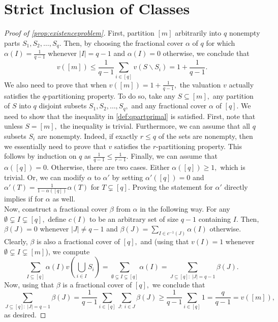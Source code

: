 \documentclass[11pt]{article}\usepackage{amsfonts}
\numberwithin{theorem}{subsection}
\begin{document}
\printbibliography
\appendix

\section{Strict Inclusion of Classes}
\label{appendix:existenceproblem}
\begin{proof}[Proof of \cref{prop:existenceproblem}]
First, partition $[m]$ arbitrarily into $q$ nonempty parts  $S_1, S_2, \ldots, S_q.$ Then, by choosing the fractional cover $\alpha$ of $q$ for which $\alpha (I) = \frac{1}{q-1}$ whenever $|I| = q-1$ and $\alpha (I) = 0$ otherwise, we conclude that 
$$
v([m])\le \frac{1}{q-1}\sum_{i\in [q]}v(S\backslash S_i) = 1+ \frac{1}{q-1}.$$
We also need to prove that when $v([m]) = 1+ \frac{1}{q-1},$ the valuation $v$ actually satisfies the $q$-partitioning property. To do so, take any $S\subseteq [m],$ any partition of  $S$ into $q$ disjoint subsets $S_1, S_2, \ldots, S_q,$ and any fractional cover $\alpha$ of $[q].$ We need to show that the inequality in \cref{def:qpartprimal} is satisfied. First, note that unless $S = [m],$ the inequality is trivial. Furthermore, we can assume that all $q$ subsets $S_i$ are nonempty. Indeed, if exactly $r\le q$ of the sets are nonempty, then we essentially need to prove that $v$ satisfies the $r$-partitioning property. This follows by induction on $q$ as $\frac{1}{q-1}\le \frac{1}{r-1}.$ Finally, we can assume that $\alpha([q]) = 0.$ Otherwise, there are two cases. Either $\alpha([q]) \ge 1,$ which is trivial. Or,  we can modify $\alpha$ to $\alpha'$ by setting $\alpha'([q]) = 0$ and $\alpha'(T) = \frac{1}{1-\alpha([q])}\alpha(T)$ for $T\subsetneq [q].$ Proving the statement for $\alpha'$ directly implies if for $\alpha$ as well.
\\
Now, construct a fractional cover $\beta$ from $\alpha$ in the following way. For any $\emptyset\subsetneq I\subsetneq[q],$ define $c(I)$ to be an arbitrary set of size $q-1$ containing $I.$ Then, $\beta(J) = 0$ whenever $|J|\neq q-1$ and $\beta(J)  =\sum_{I \in c^{-1}(J)}\alpha(I)$ otherwise. Clearly, $\beta$ is also a fractional cover of $[q],$ and (using that $v(I) = 1$ whenever $\emptyset \subsetneq I \subsetneq [m]$), we compute
$$
\sum_{{I}\subseteq [q]} \alpha({I})v(\bigcup_{i \in {I}}S_i) = 
\sum_{\emptyset \subsetneq {I}\subsetneq [q]} \alpha({I}) = 
\sum_{J\subseteq [q] : \; |J| = q-1}\beta(J).
$$
Now, using that $\beta$ is a fractional cover of $[q],$ we conclude that 
$$
\sum_{J\subseteq [q] : \; |J| = q-1}\beta(J) = 
\frac{1}{q-1}\sum_{i \in [q]}\sum_{J :\; i \in J}\beta(J) \ge
\frac{1}{q-1}\sum_{i \in [q]}1 = \frac{q}{q-1} = v([m]),
$$
as desired.
\end{proof}
\end{document}

